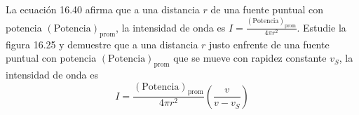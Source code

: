 \item La ecuación 16.40 afirma que a una distancia $r$ de una fuente puntual con potencia $(\text{Potencia})_{\text{prom}}$, la intensidad de onda es $I = \frac{(\text{Potencia})_{\text{prom}}}{4 \pi r^2}$. Estudie la figura 16.25 y demuestre que a una distancia $r$ justo enfrente de una fuente puntual con potencia $(\text{Potencia})_{\text{prom}}$ que se mueve con rapidez constante $v_S$, la intensidad de onda es
$$ I = \frac{(\text{Potencia})_{\text{prom}}}{4 \pi r^2} \left( \frac{v}{v - v_S} \right) $$